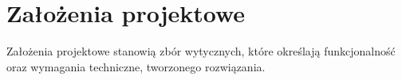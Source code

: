 \section{Założenia projektowe}
Założenia projektowe stanowią zbór wytycznych, które określają funkcjonalność oraz wymagania techniczne, tworzonego rozwiązania.



